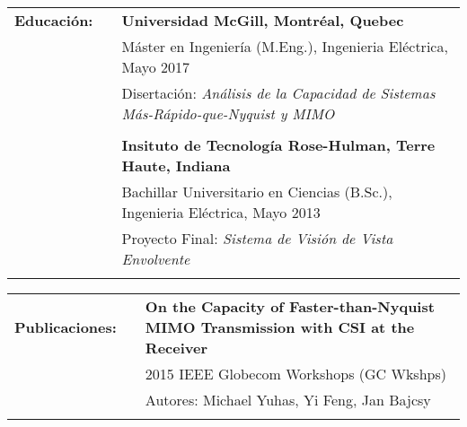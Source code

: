 \documentclass{minimal}
\begin{document}
\begin{tabular}{ p{1.5cm} p{1cm} p{16cm} }
\textbf{Educación:} & & \textbf{Universidad McGill, Montréal, Quebec} \\
& & Máster en Ingeniería (M.Eng.), Ingenieria Eléctrica, Mayo 2017\\
& & Disertación: \textit{Análisis de la Capacidad de Sistemas Más-Rápido-que-Nyquist y MIMO}\\
& & \\
& & \textbf{Insituto de Tecnología Rose-Hulman, Terre Haute, Indiana} \\
& & Bachillar Universitario en Ciencias (B.Sc.), Ingenieria Eléctrica, Mayo 2013\\
& & Proyecto Final: \textit{Sistema de Visión de Vista Envolvente}\\
& & \\
\end{tabular}

\begin{tabular}{ p{1.5cm} p{1cm} p{16cm} }
\textbf{Publicaciones:} & & \textbf{On the Capacity of Faster-than-Nyquist MIMO Transmission with CSI at the Receiver}\\
& & 2015 IEEE Globecom Workshops (GC Wkshps)\\
& & Autores: Michael Yuhas, Yi Feng, Jan Bajcsy\\
& & \\
\end{tabular}
\end{document}
